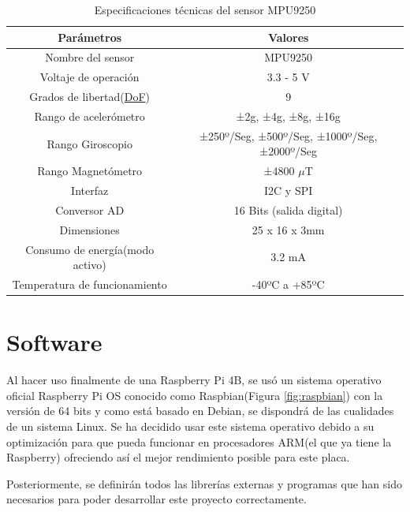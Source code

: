 \begin{table}[H]
\begin{center}
\begin{tabular}{|c|c|}
\hline
\textbf{Parámetros} & \textbf{Valores} \\
\hline

Nombre del sensor & MPU9250 \\
Voltaje de operación & 3.3 - 5 V \\  
Grados de libertad(\hyperlink{DoF}{DoF}) & 9 \\   
Rango de acelerómetro & ±2g, ±4g, ±8g, ±16g \\   
Rango Giroscopio & ±250º/Seg, ±500º/Seg, ±1000º/Seg, ±2000º/Seg \\
Rango Magnetómetro & ±4800 $ \mu $T \\  
Interfaz & I2C y SPI \\   
Conversor AD & 16 Bits (salida digital) \\   
Dimensiones & 25 x 16 x 3mm \\
Consumo de energía(modo activo) & 3.2 mA \\
Temperatura de funcionamiento & -40ºC a +85ºC \\ 


\hline
\end{tabular}
\caption{Especificaciones técnicas del sensor MPU9250}
\label{cuadro:ejemplo}
\end{center}
\end{table}

\section{Software}
\label{sec:software}


Al hacer uso finalmente de una Raspberry Pi 4B, se usó un sistema operativo oficial Raspberry Pi OS conocido como Raspbian(Figura \ref{fig:raspbian}) con la versión de 64 bits y como está basado en Debian, se dispondrá de las cualidades de un sistema Linux. Se ha decidido usar este sistema operativo debido a su optimización para que pueda funcionar en procesadores ARM(el que ya tiene la Raspberry) ofreciendo así el mejor rendimiento posible para este placa.


Posteriormente, se definirán todos las librerías externas y programas que han sido necesarios para poder desarrollar este proyecto correctamente.

